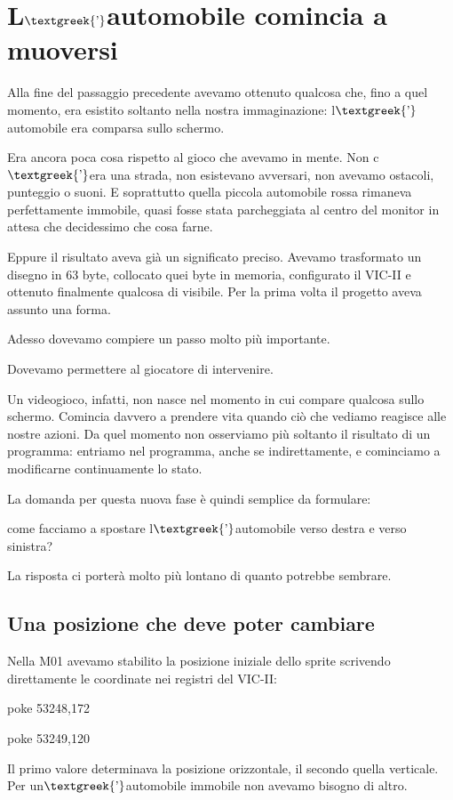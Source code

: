 \documentclass{article}
\author{HP}
\date{2026-08-18}
\begin{document}
\section{L$\text{\textgreek{’}}$automobile comincia a muoversi}
Alla fine del passaggio precedente avevamo ottenuto qualcosa che, fino a quel momento, era esistito soltanto nella
nostra immaginazione: l$\text{\textgreek{’}}$automobile era comparsa sullo schermo.

Era ancora poca cosa rispetto al gioco che avevamo in mente. Non c$\text{\textgreek{’}}$era una strada, non esistevano
avversari, non avevamo ostacoli, punteggio o suoni. E soprattutto quella piccola automobile rossa rimaneva
perfettamente immobile, quasi fosse stata parcheggiata al centro del monitor in attesa che decidessimo che cosa farne.

Eppure il risultato aveva già un significato preciso. Avevamo trasformato un disegno in 63 byte, collocato quei byte in
memoria, configurato il VIC-II e ottenuto finalmente qualcosa di visibile. Per la prima volta il progetto aveva assunto
una forma.

Adesso dovevamo compiere un passo molto più importante.

Dovevamo permettere al giocatore di intervenire.

Un videogioco, infatti, non nasce nel momento in cui compare qualcosa sullo schermo. Comincia davvero a prendere vita
quando ciò che vediamo reagisce alle nostre azioni. Da quel momento non osserviamo più soltanto il risultato di un
programma: entriamo nel programma, anche se indirettamente, e cominciamo a modificarne continuamente lo stato.

La domanda per questa nuova fase è quindi semplice da formulare:

come facciamo a spostare l$\text{\textgreek{’}}$automobile verso destra e verso sinistra?

La risposta ci porterà molto più lontano di quanto potrebbe sembrare.

\subsection{Una posizione che deve poter cambiare}
Nella M01 avevamo stabilito la posizione iniziale dello sprite scrivendo direttamente le coordinate nei registri del
VIC-II:

poke 53248,172

poke 53249,120

Il primo valore determinava la posizione orizzontale, il secondo quella verticale. Per
un$\text{\textgreek{’}}$automobile immobile non avevamo bisogno di altro.
\end{document}
